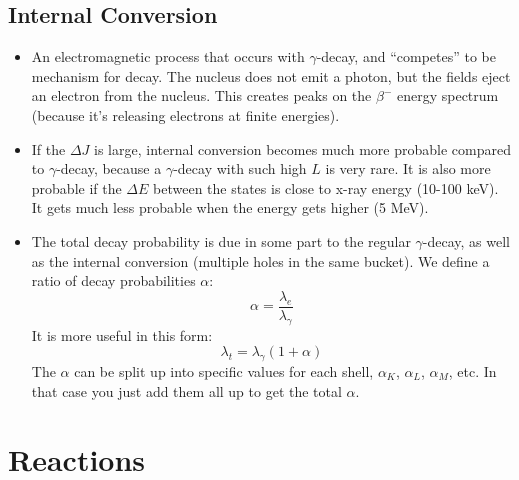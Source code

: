 \documentclass[letter]{article}
\begin{document}
\subsection{Internal Conversion}

\begin{itemize}
\item An electromagnetic process that occurs with $\gamma$-decay, and
  ``competes'' to be mechanism for decay. The nucleus does not emit a
  photon, but the fields eject an electron from the
  nucleus. This creates peaks on the $\beta^-$ energy spectrum
  (because it's releasing electrons at finite energies).~\cite[pp. 341]{lecture}
\item If the $\Delta{}J$ is large, internal conversion
  becomes much more probable compared to $\gamma$-decay, because a
  $\gamma$-decay with such high $L$ is very rare. It is also more
  probable if the $\Delta{}E$ between the states is close to x-ray
  energy (10-100 keV). It gets much less probable when the energy gets
  higher (5 MeV).
\item The total decay probability is due in some part to the regular
  $\gamma$-decay, as well as the internal conversion (multiple holes
  in the same bucket). We define a ratio of decay probabilities $\alpha$:
  \begin{equation*}
    \alpha = \frac{\lambda_e}{\lambda_\gamma}
  \end{equation*}
It is more useful in this form:
\begin{equation*}
  \lambda_t = \lambda_\gamma(1+\alpha)
\end{equation*}
The $\alpha$ can be split up into specific values for each shell,
$\alpha_K$, $\alpha_L$, $\alpha_M$, etc. In that case you just add
them all up to get the total $\alpha$.
\end{itemize}

\section{Reactions}
\end{document}
